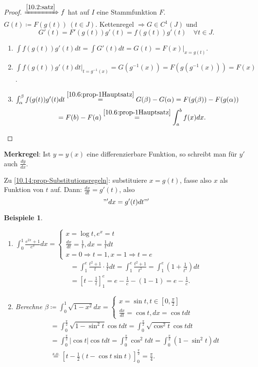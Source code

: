 \documentclass{extreport}
\theoremstyle{named}
\theoremstyle{dotless}
\newtheorem*{beispiele}{Beispiele}
\begin{document}
\begin{proof}
	$\xRightarrow[]{\ref{10.2:satz}} f$ hat auf $I$ eine Stammfunktion $F$. $G(t) \coloneqq F(g(t)) ~ (t \in J)$. Kettenregel $\Rightarrow G \in C^{1}(J)$ und
	$$ G'(t) = F'(g(t)) g'(t) = f(g(t)) g'(t) \quad \forall t \in J. $$
	\begin{enumerate}
		\item $\int f(g(t)) g'(t) dt = \int G'(t) dt = G(t) = F(x) \Big|_{x=g(t)}$.
		\item $\int f(g(t)) g'(t) dt\Big|_{t = g^{-1}(x)} = G(g^{-1}(x)) = F(g(g^{-1}(x))) = F(x)$.
		\item $\int_{\alpha}^{\beta} f(g(t)) g'(t) dt \overset{\ref{10.6:prop-1Hauptsatz}}{=} G(\beta) - G(\alpha) = F(g(\beta)) - F(g(\alpha))$ 
		$$ = F(b) - F(a) \overset{\ref{10.6:prop-1Hauptsatz}}{=} \int_{a}^{b} f(x) dx. $$ 
	\end{enumerate}
\end{proof}


\textbf{Merkregel}:  Ist $y = y(x)$ eine differenzierbare Funktion, so schreibt man für $y'$ auch $\frac{dy}{dx}$.

Zu \ref{10.14:prop-Substitutionsregeln}: substituiere $x = g(t)$, fasse also $x$ als Funktion von $t$ auf. Dann: $\frac{dx}{dt} = g'(t)$, also
	$$ "' dx = g'(t) dt "' $$


\begin{beispiele} ~\
	\begin{enumerate}
		\item $\int_{0}^{1} \frac{e^{2x} + 1}{e^{x}} dx = \begin{cases} x = \log t, e^{x} = t \\ \frac{dx}{dt} = \frac{1}{t}, dx = \frac{1}{t} dt \\ x = 0 \Rightarrow t = 1, x = 1 \Rightarrow t = e \end{cases} $
			\begin{align*}
				& = \int_{1}^{e} \frac{t^{2} + 1}{t} \cdot \frac{1}{t} dt = \int_{1}^{e} \frac{t^{2} + 1}{t^{2}} = \int_{1}^{e} (1 + \frac{1}{t^{2}}) dt \\
				& = \left[ t - \frac{1}{t} \right]_{1}^{e} = e - \frac{1}{e} - (1 - 1) = e - \frac{
				1}{e}.
			\end{align*}
		\item Berechne $\beta \coloneqq \int_{0}^{1} \sqrt{1 - x^{2}} dx = \begin{cases} x = \sin t, t \in [0, \frac{\pi}{2}] \\ \frac{dx}{dt} = \cos t, dx = \cos t dt \end{cases}$
			\begin{align*}
				& = \int_{0}^{\frac{\pi}{2}} \sqrt{1 - \sin^{2}t} \cos t dt = \int_{0}^{\frac{\pi}{2}} \sqrt{\cos^{2} t} \cos t dt \\
				& = \int_{0}^{\frac{\pi}{2}} |\cos t| \cos t dt = \int_{0}^{\frac{\pi}{2}} \cos^{2} t dt = \int_{0}^{\frac{\pi}{2}} (1 - \sin^{2} t) dt \\
				& \overset{s.o.}{=} \left[ t - \frac{1}{2} (t - \cos t \sin t) \right]_{0}^{\frac{\pi}{2}} = \frac{\pi}{4}.
			\end{align*}
	\end{enumerate}
\end{beispiele}
\end{document}
